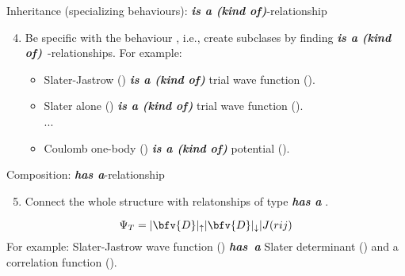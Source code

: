\begin{frame}[fragile]

  
    \begin{alertblock}{Inheritance (specializing behaviours):  {\textbf{\emph{is a (kind of)}}-relationship}}
      \begin{enumerate}\setcounter{enumi}{3}
        \item Be specific with the behaviour , i.e., create subclases by finding {\textbf{\emph{is a (kind of)}}~-relationships}.\color{blue}{(subclasses)}
        For example:
      
        \begin{itemize}
          \scriptsize
          \item Slater-Jastrow ({}) {\textbf{\emph{is a (kind of)}}} trial wave function ({}).
          
          \item Slater alone ({}) {\textbf{\emph{is a (kind of)}}} trial wave function ({}).\\
          ...
          
          \item Coulomb one-body ({}) {\textbf{\emph{is a (kind of)}}} potential ({}).
        \end{itemize}
      \end{enumerate}
    \end{alertblock}
\end{frame}



\begin{frame}[fragile]
 \begin{alertblock}{Composition: {\textbf{\emph{has a}}-relationship}}
  \begin{enumerate}\setcounter{enumi}{4}
   \item Connect the whole structure with relatonships of type  {\textbf{\emph{has a}}} \color{blue}{(composition)}.
   \end{enumerate}
    $$\Psi_T = |\bfv{D}|_{\uparrow} |\bfv{D}|_{\downarrow}| J(rij)$$
   For example: Slater-Jastrow wave function ({}) {\textbf{\emph{has~a}}} Slater determinant ({}) and a correlation function  ({}).
  

  
 \end{alertblock}
 
\end{frame}


